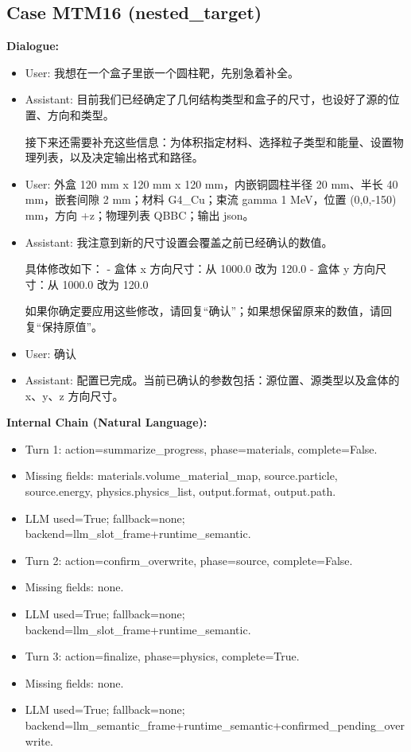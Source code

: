 \documentclass[11pt]{ctexart}
\begin{document}
\subsection{Case MTM16 (nested\_target)}
\textbf{Dialogue:}
\begin{itemize}
\item User: 我想在一个盒子里嵌一个圆柱靶，先别急着补全。
\item Assistant: 目前我们已经确定了几何结构类型和盒子的尺寸，也设好了源的位置、方向和类型。

接下来还需要补充这些信息：为体积指定材料、选择粒子类型和能量、设置物理列表，以及决定输出格式和路径。
\item User: 外盒 120 mm x 120 mm x 120 mm，内嵌铜圆柱半径 20 mm、半长 40 mm，嵌套间隙 2 mm；材料 G4\_Cu；束流 gamma 1 MeV，位置 (0,0,-150) mm，方向 +z；物理列表 QBBC；输出 json。
\item Assistant: 我注意到新的尺寸设置会覆盖之前已经确认的数值。

具体修改如下：
- 盒体 x 方向尺寸：从 1000.0 改为 120.0
- 盒体 y 方向尺寸：从 1000.0 改为 120.0

如果你确定要应用这些修改，请回复“确认”；如果想保留原来的数值，请回复“保持原值”。
\item User: 确认
\item Assistant: 配置已完成。当前已确认的参数包括：源位置、源类型以及盒体的 x、y、z 方向尺寸。
\end{itemize}
\textbf{Internal Chain (Natural Language):}
\begin{itemize}
\item Turn 1: action=summarize\_progress, phase=materials, complete=False.
\item Missing fields: materials.volume\_material\_map, source.particle, source.energy, physics.physics\_list, output.format, output.path.
\item LLM used=True; fallback=none; backend=llm\_slot\_frame+runtime\_semantic.
\item Turn 2: action=confirm\_overwrite, phase=source, complete=False.
\item Missing fields: none.
\item LLM used=True; fallback=none; backend=llm\_slot\_frame+runtime\_semantic.
\item Turn 3: action=finalize, phase=physics, complete=True.
\item Missing fields: none.
\item LLM used=True; fallback=none; backend=llm\_semantic\_frame+runtime\_semantic+confirmed\_pending\_overwrite.
\end{itemize}
\end{document}
